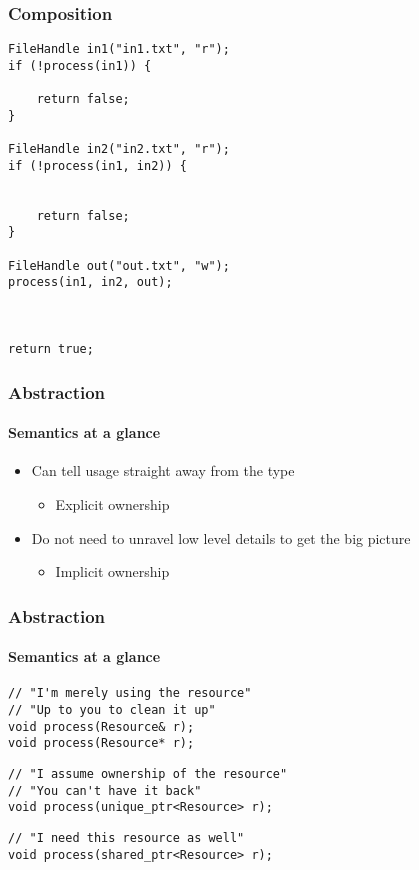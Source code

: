 \begin{frame}[fragile]
    \frametitle{Composition}
    \begin{lstlisting}[basicstyle=\scriptsize\ttfamily\color{codefg},title=With RAII]
FileHandle in1("in1.txt", "r");
if (!process(in1)) {

    return false;
}

FileHandle in2("in2.txt", "r");
if (!process(in1, in2)) {


    return false;
}

FileHandle out("out.txt", "w");
process(in1, in2, out);



return true;
    \end{lstlisting}
\end{frame}

\begin{frame}
    \frametitle{Abstraction}
    \framesubtitle{Semantics at a glance}
    \begin{itemize}
        \item Can tell usage straight away from the type
            \begin{itemize}
                \item Explicit ownership
            \end{itemize}
        \item Do not need to unravel low level details to get the big picture
            \begin{itemize}
                \item Implicit ownership
            \end{itemize}
    \end{itemize}
\end{frame}

\begin{frame}[fragile]
    \frametitle{Abstraction}
    \framesubtitle{Semantics at a glance}
    \begin{lstlisting}[title=Raw pointer]
// "I'm merely using the resource"
// "Up to you to clean it up"
void process(Resource& r);
void process(Resource* r);
    \end{lstlisting}

    \begin{lstlisting}[title=Unique pointer]
// "I assume ownership of the resource"
// "You can't have it back"
void process(unique_ptr<Resource> r);
    \end{lstlisting}

    \begin{lstlisting}[title=Shared pointer]
// "I need this resource as well"
void process(shared_ptr<Resource> r);
    \end{lstlisting}
\end{frame}

